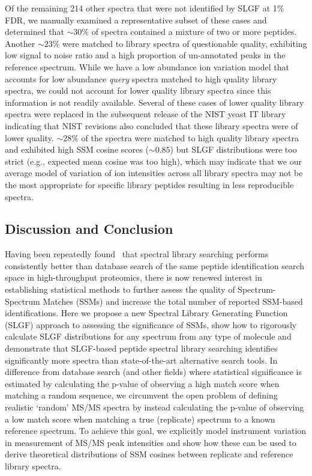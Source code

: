 \documentclass[endnotes,11pt]{article}
\begin{document}
Of the remaining 214 other spectra that were not identified by SLGF at 1\% FDR, we manually examined a representative subset of these cases and determined that $\sim 30\%$ of spectra contained a mixture of two or more peptides. Another $\sim 23\%$ were matched to library spectra of questionable quality, exhibiting low signal to noise ratio and a high proportion of un-annotated peaks in the reference spectrum. While we have a low abundance ion variation model that accounts for low abundance {\em query} spectra matched to high quality library spectra, we could not account for lower quality library spectra since this information is not readily available. Several of these cases of lower quality library spectra were replaced in the subsequent release of the NIST yeast IT library indicating that NIST revisions also concluded that these library spectra were of lower quality. $\sim 28\%$ of the spectra were matched to high quality library spectra and exhibited high SSM cosine scores ($\sim 0.85$) but SLGF distributions were too strict (e.g., expected mean cosine was too high), which may indicate that we our average model of variation of ion intensities across all library spectra may not be the most appropriate for specific library peptides resulting in less reproducible spectra. %




\subsection*{Discussion and Conclusion}

Having been repeatedly found~\cite{lam07,yen11,lam10methods,dasari12} that spectral library searching performs consistently better than database search of the same peptide identification search space in high-throughput proteomics, there is now renewed interest in establishing statistical methods to further assess the quality of Spectrum-Spectrum Matches (SSMs) and increase the total number of reported SSM-based identifications. Here we propose a new Spectral Library Generating Function (SLGF) approach to assessing the significance of SSMs, show how to rigorously calculate SLGF distributions for any spectrum from any type of molecule and demonstrate that SLGF-based peptide spectral library searching identifies significantly more spectra than state-of-the-art alternative search tools. In difference from database search (and other fields) where statistical significance is estimated by calculating the p-value of observing a high match score when matching a random sequence, we circumvent the open problem of defining realistic `random' MS/MS spectra by instead calculating the p-value of observing a low match score when matching a true (replicate) spectrum to a known reference spectrum. To achieve this goal, we explicitly model instrument variation in measurement of MS/MS peak intensities and show how these can be used to derive theoretical distributions of SSM cosines between replicate and reference library spectra.
\end{document}
